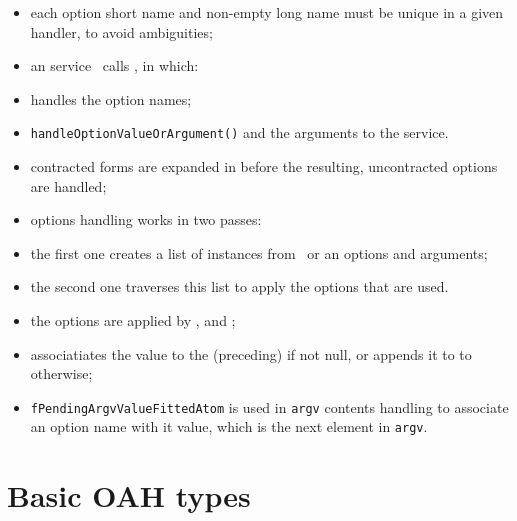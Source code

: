 \begin{itemize}
\item each option short name and non-empty long name must be unique in a given handler,
    to avoid ambiguities;

\item an service \mainFunction\ calls , in which:
  \item {} handles the option names;
  \item {\tt handleOptionValueOrArgument()}%
      and the arguments to the service.

\item contracted forms are expanded in  before the resulting,
    uncontracted options are handled;

\item options handling works in two passes:
    \item the first one creates a list of  instances from
        \argcargv\ or an options and arguments;
    \item the second one traverses this list to apply the options that are used.

\item the options are applied by ,  and
    ;

\item {} associatiates the value
    to the (preceding)  if not null,
    or appends it to  to otherwise;

\item {\tt fPendingArgvValueFittedAtom} is used in {\tt argv} contents handling
    to associate an option name with it value, which is the next element in {\tt argv}.

\end{itemize}


\section{Basic OAH types}

